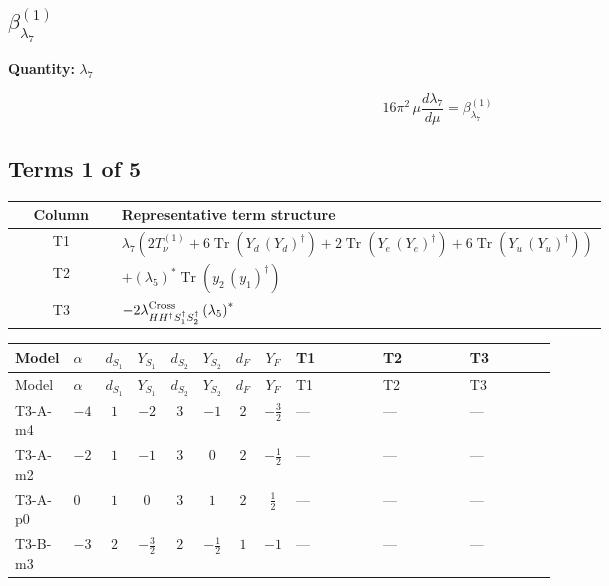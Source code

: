 \documentclass[8pt]{article}
\begin{document}
\begin{landscape}
\section*{$\beta_{\lambda_{7}}^{(1)}$}
\noindent\textbf{Quantity: }$\lambda_{7}$\par\smallskip
\[16\pi^2\,\mu\frac{d \lambda_{7}}{d\mu}=\beta_{\lambda_{7}}^{(1)}\]
\subsection*{Terms 1 of 5}
\begin{center}
\begin{tabular}{@{}c >{\raggedright\arraybackslash}p{0.82\linewidth}@{}}
\toprule
Column & Representative term structure \\
\midrule
T1 & \(\displaystyle {\lambda_{7}} (2 T_{\nu}^{(1)}+6 \operatorname{Tr}\!\left({Y_d}\,\left({Y_d}\right)^{\dagger}\right)+2 \operatorname{Tr}\!\left({Y_e}\,\left({Y_e}\right)^{\dagger}\right)+6 \operatorname{Tr}\!\left({Y_u}\,\left({Y_u}\right)^{\dagger}\right))\) \\
\midrule
T2 & \(\displaystyle +\left({\lambda_5}\right)^{*} \operatorname{Tr}\!\left({y_2}\,\left({y_1}\right)^{\dagger}\right)\) \\
\midrule
T3 & \(\displaystyle -2 {\lambda_{H H^\dagger S_1^\dagger S_2^\dagger}^{\rm Cross}} \left({\lambda_5}\right)^{*}\) \\
\midrule
\bottomrule
\end{tabular}
\end{center}
\smallskip
\tiny
\begin{longtable}{@{}llcccccc >{\raggedright\arraybackslash}p{0.21\linewidth} >{\raggedright\arraybackslash}p{0.21\linewidth} >{\raggedright\arraybackslash}p{0.21\linewidth}@{}}
\toprule
Model & $\alpha$ & $d_{S_1}$ & $Y_{S_1}$ & $d_{S_2}$ & $Y_{S_2}$ & $d_F$ & $Y_F$ & T1 & T2 & T3 \\
\midrule
\endfirsthead
\toprule
Model & $\alpha$ & $d_{S_1}$ & $Y_{S_1}$ & $d_{S_2}$ & $Y_{S_2}$ & $d_F$ & $Y_F$ & T1 & T2 & T3 \\
\midrule
\endhead
T3-A-m4 & $-4$ & $1$ & $-2$ & $3$ & $-1$ & $2$ & $-\frac{3}{2}$ & --- & --- & --- \\
\midrule
T3-A-m2 & $-2$ & $1$ & $-1$ & $3$ & $0$ & $2$ & $-\frac{1}{2}$ & --- & --- & --- \\
\midrule
T3-A-p0 & $0$ & $1$ & $0$ & $3$ & $1$ & $2$ & $\frac{1}{2}$ & --- & --- & --- \\
\midrule
T3-B-m3 & $-3$ & $2$ & $-\frac{3}{2}$ & $2$ & $-\frac{1}{2}$ & $1$ & $-1$ & --- & --- & --- \\

\end{longtable}
\end{landscape}
\end{document}
